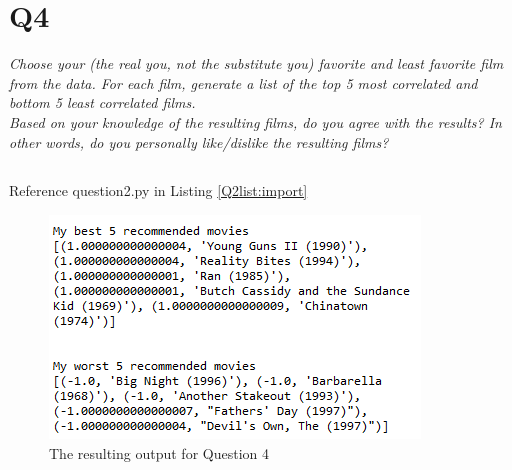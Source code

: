 \documentclass[12pt]{article}
\begin{document}
\section*{Q4}
\emph{Choose your (the real you, not the substitute you) favorite and least favorite film from the data. For each film, generate a list of the top 5 most correlated and bottom 5 least correlated films.\\
Based on your knowledge of the resulting films, do you agree with the results? In other words, do you personally like/dislike the resulting films?}
\subsection*{\color{blue}{Answer}}
Reference question2.py in Listing \ref{Q2list:import}
\begin{figure}[H]
            \centering
            \includegraphics[trim=0 0 0 0, clip, width=\textwidth] {answer4.PNG}
            \caption{ The resulting output for Question 4}
            \label{fig:1}
\end{figure}
\end{document}
